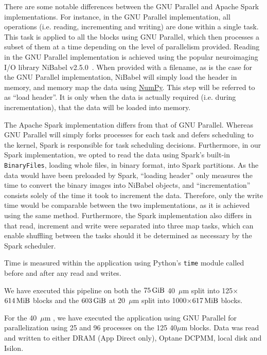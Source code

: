There are some notable differences between the GNU Parallel and Apache Spark
implementations. For instance, in the GNU Parallel implementation, all
operations (i.e. reading, incrementing and writing) are done within a single
task. This task is applied to all the \bigbrain blocks using GNU Parallel, which
then processes a subset of them at a time depending on the level of parallelism
provided. Reading in the GNU Parallel implementation is achieved using the
popular neuroimaging I/O library NiBabel v2.5.0~\cite{nibabel}. When provided
with a filename, as is the case for the GNU Parallel implementation, NiBabel
will simply load the header in memory, and memory map the data using
\href{https://numpy.org/}{NumPy}. This step will be referred to as ``load
header''. It is only when the data is actually required (i.e. during
incrementation), that the data will be loaded into memory.

The Apache Spark implementation differs from that of GNU Parallel. Whereas GNU
Parallel will simply forks processes for each task and defers scheduling to the
kernel, Spark is responsible for task scheduling decisions. Furthermore, in our
Spark implementation, we opted to read the data using Spark's built-in
\texttt{BinaryFiles}, loading whole files, in binary format, into Spark
partitions. As the data would have been preloaded by Spark, ``loading header''
only measures the time to convert the binary images into NiBabel objects, and
``incrementation'' consists solely of the time it took to increment the data.
Therefore, only the write time would be comparable between the two
implementations, as it is achieved using the same method. Furthermore, the Spark
implementation also differs in that read, increment and write were separated
into three map tasks, which can enable shuffling between the tasks should it be
determined as necessary by the Spark scheduler.

Time is measured within the application using Python's \texttt{time} module
called before and after any read and writes.

We have executed this pipeline on both the $\SI{75}{\gibi\byte}$ 40~$\mu$m
\bigbrain split into 125$\times$$\SI{614}{\mebi\byte}$ blocks and the
$\SI{603}{\gibi\byte}$ \bigbrain at 20~$\mu$m split into
1000$\times$$\SI{617}{\mebi\byte}$ blocks.

For the 40~$\mu$m \bigbrain, we have executed the application using GNU Parallel
for parallelization using 25 and 96 processes on the 125 40$\mu$m \bigbrain
blocks. Data was read and written to either DRAM (App Direct only), Optane
DCPMM, local disk and Isilon. 

